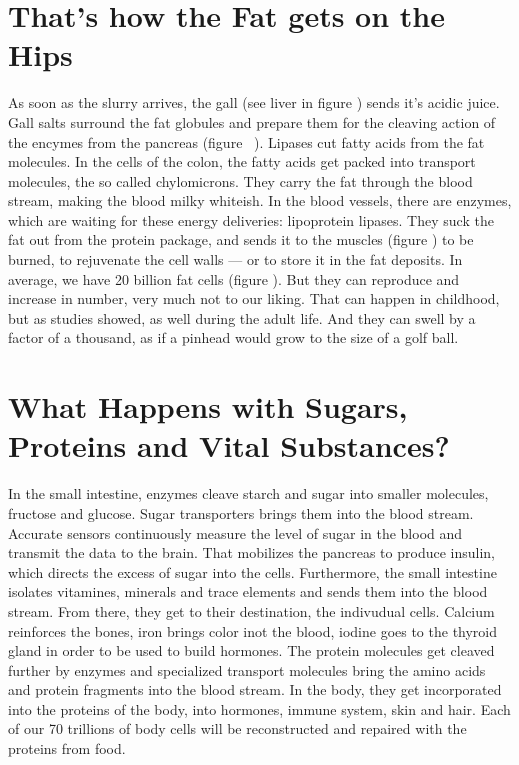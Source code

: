 \documentclass[../main.tex]{subfiles}
\begin{document}
\section{That's how the Fat gets on the Hips}

As soon as the slurry arrives, the gall (see liver in figure %
) sends it's acidic juice.
Gall salts surround the fat globules and prepare them for the cleaving action of the encymes from the pancreas (figure~%
).
Lipases cut fatty acids from the fat molecules.
In the cells of the colon, the fatty acids get packed into transport molecules, the so called chylomicrons.
They carry the fat through the blood stream, making the blood milky whiteish.
In the blood vessels, there are enzymes, which are waiting for these energy deliveries: lipoprotein lipases.
They suck the fat out from the protein package, and sends it to the muscles (figure%
) to be burned, to rejuvenate the cell walls --- or to store it in the fat deposits.
In average, we have 20 billion fat cells (figure%
).
But they can reproduce and increase in number, very much not to our liking.
That can happen in childhood, but as studies showed, as well during the adult life.
And they can swell by a factor of a thousand, as if a pinhead would grow to the size of a golf ball.

\section{What Happens with Sugars, Proteins and Vital Substances?}

In the small intestine, enzymes cleave starch and sugar into smaller molecules, fructose and glucose.
Sugar transporters brings them into the blood stream.
Accurate sensors continuously measure the level of sugar in the blood and transmit the data to the brain.
That mobilizes the pancreas to produce insulin, which directs the excess of sugar into the cells.
Furthermore, the small intestine isolates vitamines, minerals and trace elements and sends them into the blood stream.
From there, they get to their destination, the indivudual cells.
Calcium reinforces the bones, iron brings color inot the blood, iodine goes to the thyroid gland in order to be used to build hormones.
The protein molecules get cleaved further by enzymes
and specialized transport molecules bring the amino acids and protein fragments into the blood stream.
In the body, they get incorporated into the proteins of the body, into hormones, immune system, skin and hair.
Each of our 70 trillions of body cells will be reconstructed and repaired with the proteins from food.
\end{document}
